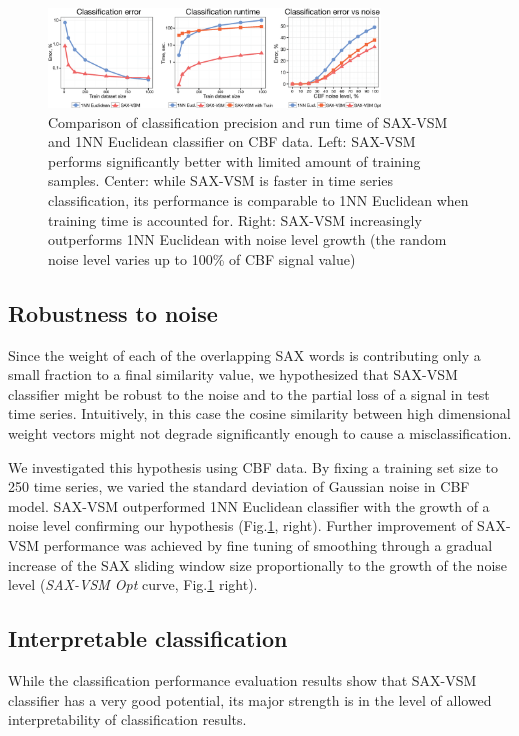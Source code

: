 \documentclass[conference]{IEEEtran}
\begin{document}
\begin{figure}[t]
   \centering
   \vspace{0.1cm}
   \includegraphics[width=88mm]{figures/precision-runtime_new.eps}
   \caption{Comparison of classification precision and run time of SAX-VSM and 1NN 
   Euclidean classifier on CBF data. 
   Left: SAX-VSM performs significantly better with limited amount of training samples. 
   Center: while SAX-VSM is faster in time series classification, its performance 
   is comparable to 1NN Euclidean when training time is accounted for.
   Right: SAX-VSM increasingly outperforms 1NN Euclidean with noise level growth 
   (the random noise level varies up to 100\% of CBF signal value)
   }
   \label{fig:precision-runtime}
   \vspace{-0.15cm}
\end{figure}

\subsection{Robustness to noise}
Since the weight of each of the overlapping SAX words is contributing only a small 
fraction to a final similarity value, we hypothesized that SAX-VSM classifier might be 
robust to the noise and to the partial loss of a signal in test time series. 
Intuitively, in this case the cosine similarity between high dimensional 
weight vectors might not degrade significantly enough to cause a misclassification.

We investigated this hypothesis using CBF data. By fixing a training set size to 250 
time series, we varied the standard deviation of Gaussian noise in CBF model.
SAX-VSM outperformed 1NN Euclidean classifier with the growth of a noise level 
confirming our hypothesis (Fig.\ref{fig:precision-runtime}, right).
Further improvement of SAX-VSM performance was achieved by fine tuning of smoothing 
through a gradual increase of the SAX sliding window size proportionally to the growth of 
the noise level (\textit{SAX-VSM Opt} curve, Fig.\ref{fig:precision-runtime} right). 

\subsection{Interpretable classification}
While the classification performance evaluation results show that SAX-VSM classifier has 
a very good potential, its major strength is in the level of allowed interpretability of 
classification results. 
\end{document}
